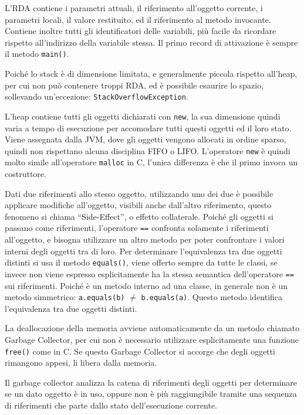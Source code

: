 \documentclass{article}
\numberwithin{equation}{subsection}
\begin{document}
L'RDA contiene i parametri attuali, il riferimento all'oggetto corrente, i parametri locali, il valore restituito, ed il riferimento al metodo invocante. Contiene inoltre tutti gli 
identificatori delle variabili, più facile da ricordare rispetto all'indirizzo della variabile stessa. 
Il primo record di attivazione è sempre il metodo \verb|main()|. 

Poiché lo stack è di dimensione limitata, e generalmente piccola rispetto all'heap, per cui non può contenere troppi RDA, ed è possibile esaurire lo spazio, sollevando un'eccezione: 
\verb|StackOverflowException|. 


L'heap contiene tutti gli oggetti dichiarati con \verb|new|, la sua dimensione quindi varia a tempo di esecuzione per accomodare tutti questi oggetti ed il loro stato. Viene assegnata 
dalla JVM, dove gli oggetti vengono allocati in ordine sparso, quindi non rispettano alcuna disciplina FIFO o LIFO. L'operatore \verb|new| è quindi molto simile all'operatore \verb|malloc| in C, 
l'unica differenza è che il primo invoca un costruttore. 

Dati due riferimenti allo stesso oggetto, utilizzando uno dei due è possibile applicare modifiche all'oggetto, visibili anche dall'altro riferimento, questo fenomeno si chiama ``Side-Effect'', 
o effetto collaterale. 
Poiché gli oggetti si passano come riferimenti, l'operatore \verb|==| confronta solamente i riferimenti all'oggetto, e bisogna utilizzare un altro metodo per poter 
confrontare i valori interni degli oggetti tra di loro.  
Per determinare l'equivalenza tra due oggetti distinti si usa il metodo \verb|equals()|, viene offerto sempre da tutte le classi, se invece non viene espresso esplicitamente 
ha la stessa semantica dell'operatore \verb|==| sui riferimenti. 
Poiché è un metodo interno ad una classe, in generale non è un metodo simmetrico: \verb|a.equals(b)| $\neq$ \verb|b.equals(a)|. 
Questo metodo identifica l'equivalenza tra due oggetti distinti. 

La deallocazione della memoria avviene automaticamente da un metodo chiamato Garbage Collector, per cui non è necessario utilizzare esplicitamente una funzione \verb|free()| 
come in C. Se questo Garbage Collector si accorge che degli oggetti rimangono appesi, li libera dalla memoria. 

Il garbage collector analizza la catena di riferimenti degli oggetti per determinare se un dato oggetto è in uso, oppure non è più raggiungibile tramite una sequenza di riferimenti che 
parte dallo stato dell'esecuzione corrente. 
\end{document}
